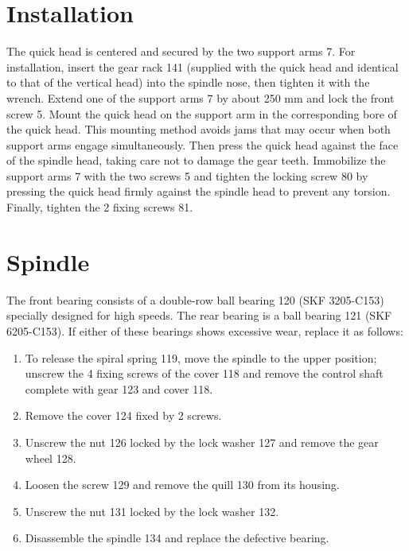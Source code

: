 \section*{Installation}
The quick head is centered and secured by the two support arms 7. For installation, insert the gear rack 141 (supplied with the quick head and identical to that of the vertical head) into the spindle nose, then tighten it with the wrench. Extend one of the support arms 7 by about 250 mm and lock the front screw 5. Mount the quick head on the support arm in the corresponding bore of the quick head. This mounting method avoids jams that may occur when both support arms engage simultaneously. Then press the quick head against the face of the spindle head, taking care not to damage the gear teeth. Immobilize the support arms 7 with the two screws 5 and tighten the locking screw 80 by pressing the quick head firmly against the spindle head to prevent any torsion. Finally, tighten the 2 fixing screws 81.

\section*{Spindle}

The front bearing consists of a double-row ball bearing 120 (SKF 3205-C153) specially designed for high speeds. The rear bearing is a ball bearing 121 (SKF 6205-C153). If either of these bearings shows excessive wear, replace it as follows:
\vspace{-\parskip}
\begin{enumerate}
    \item To release the spiral spring 119, move the spindle to the upper position; unscrew the 4 fixing screws of the cover 118 and remove the control shaft complete with gear 123 and cover 118.
    \item Remove the cover 124 fixed by 2 screws.
    \item Unscrew the nut 126 locked by the lock washer 127 and remove the gear wheel 128.
    \item Loosen the screw 129 and remove the quill 130 from its housing.
    \item Unscrew the nut 131 locked by the lock washer 132.
    \item Disassemble the spindle 134 and replace the defective bearing.
\end{enumerate}
